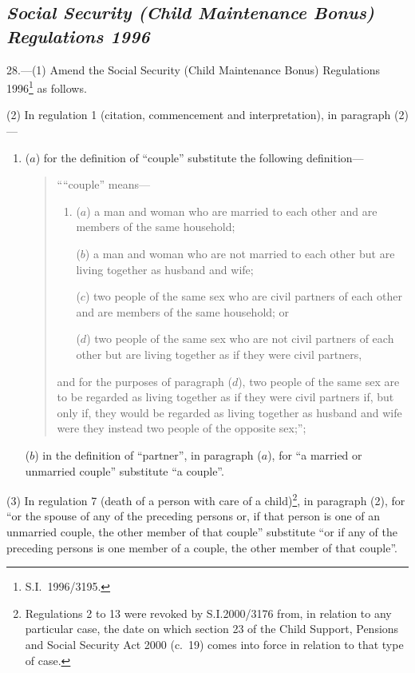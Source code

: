 \documentclass[12pt,a4paper]{article}
\begin{document}
\subsection*{\itshape Social Security (Child Maintenance Bonus) Regulations 1996}

28.---(1)  Amend the Social Security (Child Maintenance Bonus) Regulations 1996\footnote{S.I.\ 1996/3195.} as follows.

(2) In regulation 1 (citation, commencement and interpretation), in paragraph (2)—
\begin{enumerate}\item[]
($a$) for the definition of “couple” substitute the following definition—
\begin{quotation}
““couple” means—
\begin{enumerate}\item[]
($a$) 
a man and woman who are married to each other and are members of the same household;

($b$) 
a man and woman who are not married to each other but are living together as husband and wife;

($c$) 
two people of the same sex who are civil partners of each other and are members of the same household; or

($d$) 
two people of the same sex who are not civil partners of each other but are living together as if they were civil partners,
\end{enumerate}
and for the purposes of paragraph ($d$), two people of the same sex are to be regarded as living together as if they were civil partners if, but only if, they would be regarded as living together as husband and wife were they instead two people of the opposite sex;”;
\end{quotation}

($b$) in the definition of “partner”, in paragraph ($a$), for “a married or unmarried couple” substitute “a couple”.
\end{enumerate}

(3) In regulation 7 (death of a person with care of a child)\footnote{Regulations 2 to 13 were revoked by S.I.2000/3176 from, in relation to any particular case, the date on which section 23 of the Child Support, Pensions and Social Security Act 2000 (c.\ 19) comes into force in relation to that type of case.}, in paragraph (2), for “or the spouse of any of the preceding persons or, if that person is one of an unmarried couple, the other member of that couple” substitute “or if any of the preceding persons is one member of a couple, the other member of that couple”.
\end{document}
